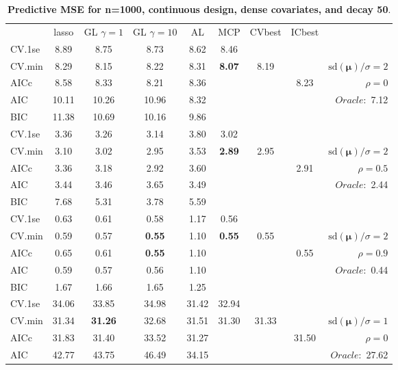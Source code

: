 \begin{table}\vspace{-.5cm}
\caption[l]{ { \bf Predictive MSE for n=1000, continuous design, 
dense covariates, and  decay  50}.}
\vspace{-.5cm}
\footnotesize{}
\begin{center}
\begin{tabular}{l*{7}{c}|r}
 & lasso & GL $\gamma=1$ & GL $\gamma=10$ & AL & MCP  & CVbest & ICbest  \\
\cline{1-9}
CV.1se & 8.89 & 8.75 & 8.73 & 8.62 & 8.46 & & & \\
CV.min & 8.29 & 8.15 & 8.22 & 8.31 & {\bf 8.07} & 8.19 & & $\mathrm{sd}(\mathbf{\mu})/\sigma=2$ \\
AICc & 8.58 & 8.33 & 8.21 & 8.36 & & & 8.23 &  $\rho=0$ \\
AIC & 10.11 & 10.26 & 10.96 & 8.32 & & & &  \multirow{2}{*}{$Oracle: $ 7.12} \\
BIC & 11.38 & 10.69 & 10.16 & 9.86 & & & &  \\
 \hline 
CV.1se & 3.36 & 3.26 & 3.14 & 3.80 & 3.02 & & & \\
CV.min & 3.10 & 3.02 & 2.95 & 3.53 & {\bf 2.89} & 2.95 & & $\mathrm{sd}(\mathbf{\mu})/\sigma=2$ \\
AICc & 3.36 & 3.18 & 2.92 & 3.60 & & & 2.91 &  $\rho=0.5$ \\
AIC & 3.44 & 3.46 & 3.65 & 3.49 & & & &  \multirow{2}{*}{$Oracle: $ 2.44} \\
BIC & 7.68 & 5.31 & 3.78 & 5.59 & & & &  \\
 \hline 
CV.1se & 0.63 & 0.61 & 0.58 & 1.17 & 0.56 & & & \\
CV.min & 0.59 & 0.57 & {\bf 0.55} & 1.10 & {\bf 0.55} & 0.55 & & $\mathrm{sd}(\mathbf{\mu})/\sigma=2$ \\
AICc & 0.65 & 0.61 & {\bf 0.55} & 1.10 & & & 0.55 &  $\rho=0.9$ \\
AIC & 0.59 & 0.57 & 0.56 & 1.10 & & & &  \multirow{2}{*}{$Oracle: $ 0.44} \\
BIC & 1.67 & 1.66 & 1.65 & 1.25 & & & &  \\
 \hline 
CV.1se & 34.06 & 33.85 & 34.98 & 31.42 & 32.94 & & & \\
CV.min & 31.34 & {\bf 31.26} & 32.68 & 31.51 & 31.30 & 31.33 & & $\mathrm{sd}(\mathbf{\mu})/\sigma=1$ \\
AICc & 31.83 & 31.40 & 33.52 & 31.27 & & & 31.50 &  $\rho=0$ \\
AIC & 42.77 & 43.75 & 46.49 & 34.15 & & & &  \multirow{2}{*}{$Oracle: $ 27.62} \\

\end{tabular}
\end{center}
\end{table}
